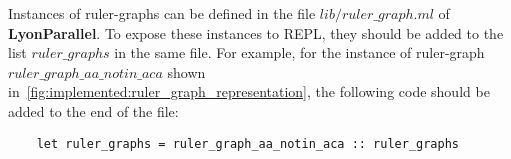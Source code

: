 Instances of ruler-graphs can be defined in the file \colorbox{Ivory2}{$lib/ruler\_graph.ml$} of \textbf{LyonParallel}. To expose these instances to REPL, they should be added to the list \colorbox{Ivory2}{$ruler\_graphs$} in the same file. For example, for the instance of ruler-graph \colorbox{Ivory2}{$ruler\_graph\_aa\_notin\_aca$} shown in~\autoref{fig:implemented:ruler_graph_representation}, the following code should be added to the end of the file:
\begin{verbatim}
    let ruler_graphs = ruler_graph_aa_notin_aca :: ruler_graphs 
\end{verbatim}



